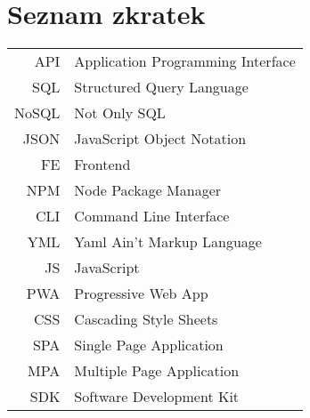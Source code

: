 
\chapter{Seznam zkratek}

\begin{tabular}{rl}
    API & Application Programming Interface \\
    SQL & Structured Query Language \\
    NoSQL & Not Only SQL \\
    JSON & JavaScript Object Notation \\
    FE & Frontend \\
    NPM & Node Package Manager \\
    CLI & Command Line Interface \\
    YML & Yaml Ain't Markup Language \\
    JS & JavaScript \\
    PWA & Progressive Web App \\
    CSS & Cascading Style Sheets \\
    SPA & Single Page Application \\
    MPA & Multiple Page Application \\
    SDK & Software Development Kit \\
\end{tabular}
